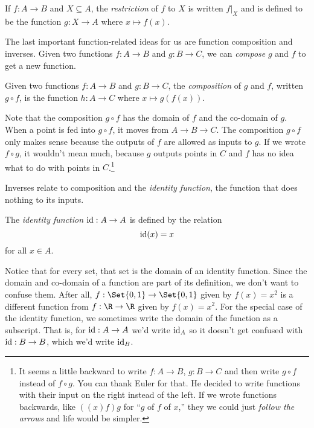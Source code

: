 	\begin{definition}[Restriction]
		If $f:A\to B$ and $X\subseteq A$, the \emph{restriction}
		of $f$ to $X$ is written 
		$f\big|_X$ and is defined to be the function $g:X\to A$ where $x\mapsto f(x)$.
	\end{definition}

	The last important function-related ideas for us are function composition and inverses.
	Given two functions $f:A\to B$ and $g:B\to C$, we can \emph{compose}
	$g$ and $f$ to get a new function.
	\begin{definition}[Composition]
		Given two functions $f:A\to B$ and $g:B\to C$, the \emph{composition} of
		$g$ and $f$, written $g\circ f$, is the function $h:A\to C$ where 
		$x\mapsto g(f(x))$.
	\end{definition}
	Note that the composition $g\circ f$ has the domain of $f$ and the co-domain of $g$.
	When a point is fed into $g\circ f$, it moves from $A\to B\to C$.  The composition
	$g\circ f$ only makes sense because the outputs of $f$ are allowed as inputs to $g$.
	If we wrote $f\circ g$, it wouldn't mean much, because $g$ outputs points in $C$ and $f$
	has no idea what to do with points in $C$.\footnote{
		It seems a little backward to write $f:A\to B$, $g:B\to C$ and then
		write $g\circ f$ instead of $f\circ g$.  You can thank Euler for that.
		He decided to write functions with their input on the right instead of
		the left.  If we wrote functions backwards, like $((x)f)g$ for ``$g$ of $f$ of $x$,''
		they we could just \emph{follow the arrows} and life would be simpler.
	}

	Inverses relate to composition and the \emph{identity function}, the function
	that does nothing to its inputs.
	\begin{definition}
		The \emph{identity function} $\operatorname{id}:A\to A$ is defined by the relation
		\[
			\operatorname{id}(x)=x
		\]
		for all $x\in A$.
	\end{definition}
	Notice that for every set, that set
	is the domain of an identity function.  Since the domain
	and co-domain of a function are part of its definition, we don't want to confuse them.
	After all, $f:\Set{0,1}\to \Set{0,1}$ given by $f(x)=x^2$ is a different function from $f:\R\to\R$
	given by $f(x)=x^2$.  For the special case of the identity function, we sometimes write
	the domain of the function as a subscript.  That is, 
	for $\operatorname{id}:A\to A$ we'd write $\operatorname{id}_A$ so it
	doesn't get confused with $\operatorname{id}:B\to B$, which we'd write $\operatorname{id}_B$.

